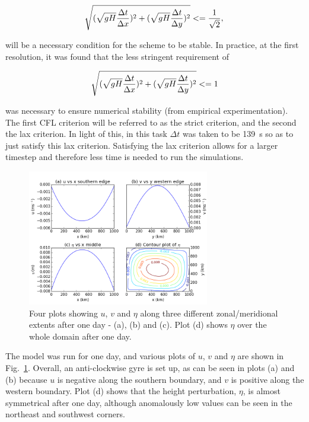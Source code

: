 \documentclass{article}
\begin{document}
\begin{equation}
    \label{eqn:cfl_strict} 
    \sqrt{(\sqrt{g H} \frac{\Delta t}{\Delta x})^2 + (\sqrt{g H} \frac{\Delta t}{\Delta y})^2} <=
    \frac{1}{\sqrt{2}},\\
\end{equation}

will be a necessary condition for the scheme to be stable. In practice, at the first resolution, it
was found that the less stringent requirement of

\begin{equation}
    \label{eqn:cfl_lax} 
    \sqrt{(\sqrt{g H} \frac{\Delta t}{\Delta x})^2 + (\sqrt{g H} \frac{\Delta t}{\Delta y})^2} <=
    1\\
\end{equation}

was necessary to ensure numerical stability (from empirical experimentation). The first CFL
criterion will be referred to as the strict criterion, and the second the lax criterion. In light of
this, in this task $\Delta t$ was taken to be \SI{139}{s} so as to just satisfy this lax criterion.
Satisfying the lax criterion allows for a larger timestep and therefore less time is needed to run
the simulations.

\begin{figure}[ht!]
    \centering
    \includegraphics[width=300px]{figures/task_a}
    \caption{Four plots showing $u$, $v$ and $\eta$ along three different zonal/meridional extents
	after one day - (a), (b) and (c). Plot (d) shows $\eta$ over the whole domain after one
    day.}
    \label{fig:task_a}
\end{figure}

The model was run for one day, and various plots of $u$, $v$ and $\eta$ are shown in Fig.\
\ref{fig:task_a}. Overall, an anti-clockwise gyre is set up, as can be seen in plots (a) and (b)
because $u$ is negative along the southern boundary, and $v$ is positive along the western boundary.
Plot (d) shows that the height perturbation, $\eta$, is almost symmetrical after one day, although
anomalously low values can be seen in the northeast and southwest corners.
\end{document}
